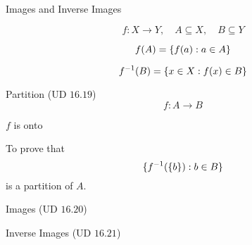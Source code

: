 \begin{frame}{}
  \centerline{\LARGE Images and Inverse Images}

  \[
    f: X \to Y, \quad A \subseteq X, \quad B \subseteq Y
  \]

  \[
    f(A) = \{f(a): a \in A\}
  \]

  \[
    f^{-1}(B) = \{x \in X: f(x) \in B\}
  \]
\end{frame}

\begin{frame}{}
  \begin{exampleblock}{Partition (UD $16.19$)}
    \[
      f: A \to B
    \]

    \centerline{$f$ is onto}

    To prove that
    \[
      \{f^{-1}(\{b\}): b \in B\}
    \]
    is a partition of $A$.
  \end{exampleblock}
\end{frame}

\begin{frame}{}
  \begin{exampleblock}{Images (UD $16.20$)}
  \end{exampleblock}
\end{frame}

\begin{frame}{}
  \begin{exampleblock}{Inverse Images (UD $16.21$)}
  \end{exampleblock}
\end{frame}
